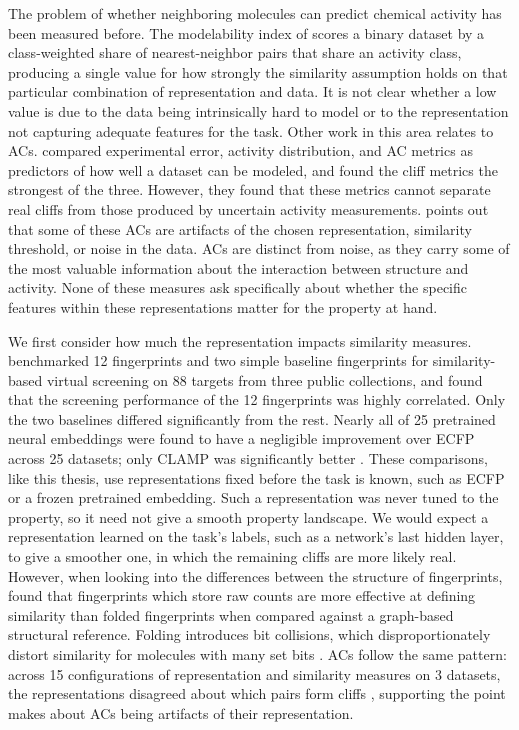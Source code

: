 The problem of whether neighboring molecules can predict chemical activity has been measured before. The modelability index of \citet{Golbraikh2014} scores a binary dataset by a class-weighted share of nearest-neighbor pairs that share an activity class, producing a single value for how strongly the similarity assumption holds on that particular combination of representation and data. It is not clear whether a low value is due to the data being intrinsically hard to model or to the representation not capturing adequate features for the task. Other work in this area relates to ACs. \citet{Sheridan2020} compared experimental error, activity distribution, and AC metrics as predictors of how well a dataset can be modeled, and found the cliff metrics the strongest of the three. However, they found that these metrics cannot separate real cliffs from those produced by uncertain activity measurements. \citet{MedinaFranco2013} points out that some of these ACs are artifacts of the chosen representation, similarity threshold, or noise in the data. ACs are distinct from noise, as they carry some of the most valuable information about the interaction between structure and activity. None of these measures ask specifically about whether the specific features within these representations matter for the property at hand. 

We first consider how much the representation impacts similarity measures. \citet{Riniker2013} benchmarked 12 fingerprints and two simple baseline fingerprints for similarity-based virtual screening on 88 targets from three public collections, and found that the screening performance of the 12 fingerprints was highly correlated. Only the two baselines differed significantly from the rest. Nearly all of 25 pretrained neural embeddings were found to have a negligible improvement over ECFP across 25 datasets; only CLAMP was significantly better \citep{Praski2025}. These comparisons, like this thesis, use representations fixed before the task is known, such as ECFP or a frozen pretrained embedding. Such a representation was never tuned to the property, so it need not give a smooth property landscape. We would expect a representation learned on the task's labels, such as a network's last hidden layer, to give a smoother one, in which the remaining cliffs are more likely real. However, when looking into the differences between the structure of fingerprints, \citet{Huber2026} found that fingerprints which store raw counts are more effective at defining similarity than folded fingerprints when compared against a graph-based structural reference. Folding introduces bit collisions, which disproportionately distort similarity for molecules with many set bits \citep{Huber2026}. ACs follow the same pattern: across 15 configurations of representation and similarity measures on 3 datasets, the representations disagreed about which pairs form cliffs \citep{DabrowskiTumanski2026}, supporting the point \citet{MedinaFranco2013} makes about ACs being artifacts of their representation. 

